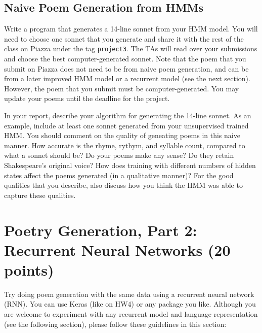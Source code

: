 \subsection{Naive Poem Generation from HMMs}
Write a program that generates a 14-line sonnet from your HMM model. You will need to choose one sonnet that you generate and share it with the rest of the class on Piazza under the tag {\tt project3}. The TAs will read over your submissions and choose the best computer-generated sonnet. Note that the poem that you submit on Piazza does not need to be from naive poem generation, and can be from a later improved HMM model or a recurrent model (see the next section). However, the poem that you submit must be computer-generated. You may update your poems until the deadline for the project.

\begin{report}
    In your report, describe your algorithm for generating the 14-line sonnet. As an example, include at least one sonnet generated from your unsupervised trained HMM. You should comment on the quality of geneating poems in this naive manner. How accurate is the rhyme, rythym, and syllable count, compared to what a sonnet should be? Do your poems make any sense? Do they retain Shakespeare's original voice? How does training with different numbers of hidden states affect the poems generated (in a qualitative manner)? For the good qualities that you describe, also discuss how you think the HMM was able to capture these qualities.
\end{report}

\section{Poetry Generation, Part 2: Recurrent Neural Networks (20 points)}
\label{sec:rnn}

Try doing poem generation with the same data using a recurrent neural network (RNN). You can use Keras (like on HW4) or any package you like. Although you are welcome to experiment with any recurrent model and language representation (see the following section), please follow these guidelines in this section:


